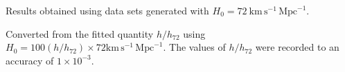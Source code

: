 \begin{table}
\begin{threeparttable}
\begin{tablenotes}
\item[b]
Results obtained using data sets generated with
$H_0 = 72\ \mathrm{km\,\mathrm{s}^{-1}\,\mathrm{Mpc}^{-1}}$.

\item[c]
Converted from the fitted quantity $h/h_{72}$ using
$H_0 = 100 \left( h/h_{72} \right) \times 72 \mathrm{km}\,\mathrm{s}^{-1}\,\mathrm{Mpc}^{-1}$.
The values of $h/h_{72}$ were recorded to an accuracy of $ 1 \times 10^{-3}$.

\end{tablenotes}

\end{threeparttable}

\end{table}
